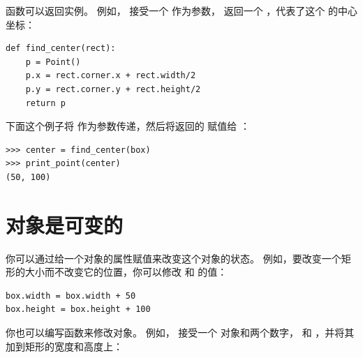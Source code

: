 函数可以返回实例。 例如，  接受一个  作为参数，
返回一个  ，代表了这个  的中心坐标：

\begin{lstlisting}
def find_center(rect):
    p = Point()
    p.x = rect.corner.x + rect.width/2
    p.y = rect.corner.y + rect.height/2
    return p
\end{lstlisting}

%

下面这个例子将  作为参数传递，然后将返回的  赋值给 ：

\begin{lstlisting}
>>> center = find_center(box)
>>> print_point(center)
(50, 100)
\end{lstlisting}
%

\section{对象是可变的}
  



你可以通过给一个对象的属性赋值来改变这个对象的状态。
例如，要改变一个矩形的大小而不改变它的位置，你可以修改  和  的值：

\begin{lstlisting}
box.width = box.width + 50
box.height = box.height + 100
\end{lstlisting}

%

你也可以编写函数来修改对象。
例如， 接受一个 对象和两个数字，
 和 ，并将其加到矩形的宽度和高度上：

